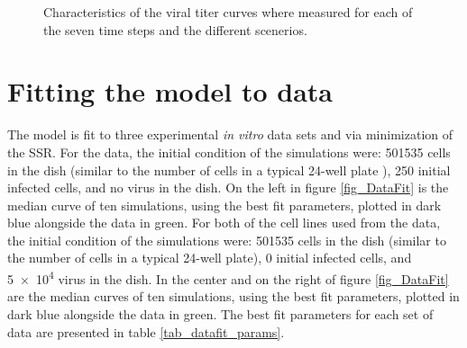 \begin{figure}
\begin{minipage}{\linewidth}
{    }
\end{minipage}
\caption{Characteristics of the viral titer curves where measured for each of the seven time steps and the different scenerios.\label{fig_AspectGraphs}}
\end{figure}

\section{Fitting the model to data} \label{result_fit}

The model is fit to three experimental \emph{in vitro} data sets \citep{pinilla12} and \citep{wang_susceptibility_2021} via minimization of the SSR. For the \citep{pinilla12} data, the initial condition of the simulations were: 501535 cells in the dish (similar to the number of cells in a typical 24-well plate \citep{Number_of_cells_in_a_dish}), 250 initial infected cells, and no virus in the dish. On the left in figure \ref{fig_DataFit} is the median curve of ten simulations, using the best fit parameters, plotted in dark blue alongside the data in green. For both of the cell lines used from the \citep{wang_susceptibility_2021} data, the initial condition of the simulations were: 501535 cells in the dish (similar to the number of cells in a typical 24-well plate), 0 initial infected cells, and \num{5e4} virus in the dish. In the center and on the right of figure \ref{fig_DataFit} are the median curves of ten simulations, using the best fit parameters, plotted in dark blue alongside the data in green. The best fit parameters for each set of data are presented in table \ref{tab_datafit_params}.

